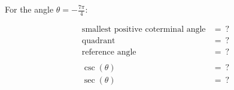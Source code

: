 For the angle $\theta = -\frac{7\pi}{4}$:

$$
\begin{align*}
  \text{smallest positive coterminal angle} &=\ ? \\
  \text{quadrant} &=\ ? \\
  \text{reference angle} &=\ ? \\
  \\
  \csc(\theta) &=\ ? \\
  \sec(\theta) &=\ ?
\end{align*}
$$
